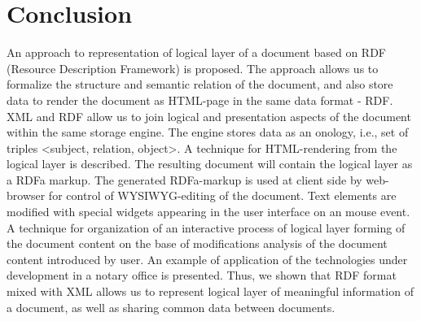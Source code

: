 \documentclass[conference]{IEEEtran}
\begin{document}
{{%
%





\section{Conclusion}
An approach to representation of logical layer of a document based on RDF (Resource Description Framework) is proposed. The approach allows us to formalize the structure and semantic relation of the document, and also store data to render the document as HTML-page in the same data format - RDF. XML and RDF allow us to join logical and presentation aspects of the document within the same storage engine. The engine stores data as an onology, i.e., set of triples <subject, relation, object>. A technique for HTML-rendering from the logical layer is described. The resulting document will contain the logical layer as a RDFa markup. The generated RDFa-markup is used at client side by web-browser for control of WYSIWYG-editing of the document. Text elements are modified with special widgets appearing in the user interface on an mouse event. A technique for organization of an interactive process of logical layer forming of the document content on the base of modifications analysis of the document content introduced by user. An example of application of the technologies under development in a notary office is presented. Thus, we shown that RDF format mixed with XML allows us to represent logical layer of meaningful information of a document, as well as sharing common data between documents.

}}
\end{document}
